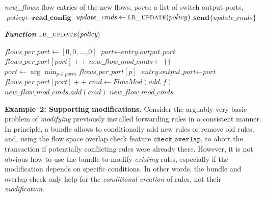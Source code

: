 \documentclass[conference]{sigcomm-alternate}
\newcommand{\checko}{\texttt{check\_overlap}\xspace}
\newcommand{\petr}[1]{\textit{\textcolor{blue}{[petr]: #1}}} %
\begin{document}
{\small
\begin{algorithm}[t]
    \caption{$\textit{Na\"ive Flow Balancing}$}
    \label{alg:naive-lb}
\begin{algorithmic}[1]

    \Require \emph{new\_flows}: flow entries of the new flows,
    \emph{ports}: a list of switch output ports,
    \State $\textit{policy} \gets \textbf{read\_config}$
    \State $\textit{update\_cmds} \gets \textsc{lb\_update}(policy)$ %
    \State $\textbf{send}\{\textit{update\_cmds}\}$
    \Statex

    \Statex \emph{\bf Function} $\textsc{lb\_update}(\textit{policy})$ %

	\State $\textit{flows\_per\_port} \gets [0, 0, \ldots, 0]$
	    \State $\textit{port} \gets \textit{entry.output\_port}$
	    \State $\textit{flows\_per\_port}[\textit{port}]++$
	\EndFor
	\State $\textit{new\_flow\_mod\_cmds} \gets \{\}$
	    \State $\textit{port} \gets \arg\min_{p\in \textit{ports}} \textit{flows\_per\_port}[p]$
	    \State $\textit{entry.output\_port} \gets \textit{port}$
	    \State $\textit{flows\_per\_port}[\textit{port}]++$
	    \State $\textit{cmd} \gets \textit{FlowMod}(add,f)$
	    \State $\textit{new\_flow\_mod\_cmds}.\textit{add}(\textit{cmd})$
	\EndFor
	\Return $\textit{new\_flow\_mod\_cmds}$
\end{algorithmic}
\end{algorithm}
}


\vspace{1mm}
\noindent\textbf{Example~2: Supporting modifications.}
Consider the arguably very basic problem of \emph{modifying} previously installed forwarding rules
in a consistent manner.
In principle, a bundle allows to conditionally add new rules or remove
old rules, and, using the flow space overlap
check feature $\checko$, to abort the transaction if potentially conflicting
rules were already there. However, it is not obvious how
to use the bundle to
modify \emph{existing} rules, especially if the modification depends on
specific conditions.
In other words, the bundle and overlap check only help
for the \emph{conditional creation} of rules, not their \emph{modification}.
\end{document}
